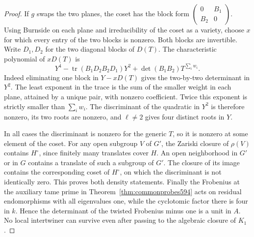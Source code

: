 \documentclass[a4paper,11pt]{article}
\theoremstyle{definition}
\theoremstyle{remark}
\numberwithin{equation}{section}
\begin{document}
\begin{proof}
If \(g\) swaps the two planes, the coset has the block
form \(\left(\begin{smallmatrix}0&B_1\\B_2&0\end{smallmatrix}\right)\).
Using Burnside on each plane and irreducibility of the
coset as a variety, choose \(x\) for which every entry
of the two blocks is nonzero. Both blocks are invertible.
Write \(D_1,D_2\) for the two diagonal blocks of \(D(T)\).
The characteristic polynomial of \(xD(T)\) is
\[
       Y^4-\operatorname{tr}(B_1D_2B_2D_1)Y^2
                   +\det(B_1B_2)T^{\sum_i w_i}.
\]
Indeed eliminating one block in \(Y-xD(T)\) gives the
two-by-two determinant in \(Y^2\). The least exponent
in the trace is the sum of the smaller weight in each
plane, attained by a unique pair, with nonzero coefficient.
Twice this exponent is strictly smaller than \(\sum_iw_i\).
The discriminant of the quadratic in \(Y^2\) is therefore
nonzero, its two roots are nonzero, and \(\ell\ne2\)
gives four distinct roots in \(Y\).

In all cases the discriminant is nonzero for the generic
\(T\), so it is nonzero at some element of the coset.
For any open subgroup \(V\) of \(G'\), the Zariski closure
of \(\rho(V)\) contains \(H^\circ\), since finitely many
translates cover \(H\). An open neighborhood in \(G'\) or
in \(G\) contains a translate of such a subgroup of \(G'\).
The closure of its image contains the corresponding coset
of \(H^\circ\), on which the discriminant is not identically
zero. This proves both density statements. Finally the
Frobenius at the auxiliary tame prime in
Theorem~\ref{thm:commonprobes594} acts on residual
endomorphisms with all eigenvalues one, while the
cyclotomic factor there is four in \(k\). Hence the
determinant of the twisted Frobenius minus one is a unit
in \(A\). No local intertwiner can survive even after
passing to the algebraic closure of \(K_1\).
\end{proof}
\end{document}
